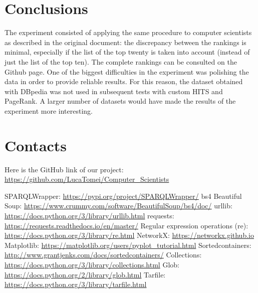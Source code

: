 \documentclass[12pt, twoside]{article}
\def\blankpage{%
      \clearpage%
      \thispagestyle{empty}%
      \addtocounter{page}{-1}%
      \null%
      \clearpage}
\let\oldlstlistoflistings\lstlistoflistings
\renewcommand{\lstlistoflistings}{%
  \begingroup%
  \let\oldnumberline\numberline%
  \renewcommand{\numberline}{\lstlistingname~\oldnumberline}%
  \oldlstlistoflistings%
  \endgroup}
\begin{document}
\newpage

\section{Conclusions}
The experiment consisted of applying the same procedure to computer scientists as described in the original document: the discrepancy between the rankings is minimal, especially if the list of the top twenty is taken into account (instead of just the list of the top ten). The complete rankings can be consulted on the Github page. One of the biggest difficulties in the experiment was polishing the data in order to provide reliable results. For this reason, the dataset obtained with DBpedia was not used in subsequent tests with custom HITS and PageRank. A larger number of datasets would have made the results of the experiment more interesting.
\section{Contacts}
Here is the GitHub link of our project: \href{https://github.com/LucaTomei/Computer_Scientists}{https://github.com/LucaTomei/Computer\_Scientists}


\newpage
\blankpage

\newpage
\listoffigures
\lstlistoflistings
\newpage

\begin{thebibliography}{X} %
	SPARQLWrapper: \href{https://pypi.org/project/SPARQLWrapper/}{https://pypi.org/project/SPARQLWrapper/}
 bs4 Beautiful Soup: \href{https://www.crummy.com/software/BeautifulSoup/bs4/doc/}{https://www.crummy.com/software/BeautifulSoup/bs4/doc/}
 urllib: \href{https://docs.python.org/3/library/urllib.html}{https://docs.python.org/3/library/urllib.html}
 requests: \href{https://requests.readthedocs.io/en/master/}{https://requests.readthedocs.io/en/master/}
 Regular expression operations (re): \href{https://docs.python.org/3/library/re.html}{https://docs.python.org/3/library/re.html}
 NetworkX: \href{https://networkx.github.io}{https://networkx.github.io}
 Matplotlib: \href{https://matplotlib.org/users/pyplot\_tutorial.html}{https://matplotlib.org/users/pyplot\_tutorial.html}
 Sortedcontainers: \href{http://www.grantjenks.com/docs/sortedcontainers/}{http://www.grantjenks.com/docs/sortedcontainers/}
 Collections: \href{https://docs.python.org/3/library/collections.html}{https://docs.python.org/3/library/collections.html}
 Glob: \href{https://docs.python.org/2/library/glob.html}{https://docs.python.org/2/library/glob.html}
 Tarfile: \href{https://docs.python.org/3/library/tarfile.html}{https://docs.python.org/3/library/tarfile.html}

\end{thebibliography}
\end{document}
